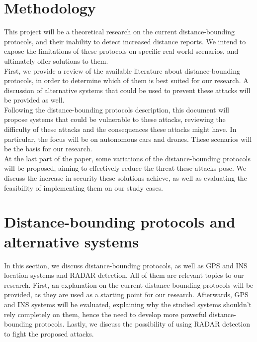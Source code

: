 \documentclass{article}
\begin{document}
\section{Methodology}
\label{sec:methodology}

This project will be a theoretical research on the current distance-bounding protocols, and their inability to detect increased distance reports. We intend to expose the limitations of these protocols on specific real world scenarios, and ultimately offer solutions to them.\\

First, we provide a review of the available literature about distance-bounding protocols, in order to determine which of them is best suited for our research. A discussion of alternative systems that could be used to prevent these attacks will be provided as well.\\

Following the distance-bounding protocols description, this document will propose systems that could be vulnerable to these attacks, reviewing the difficulty of these attacks and the consequences these attacks might have. In particular, the focus will be on autonomous cars and drones. These scenarios will be the basis for our research.\\

At the last part of the paper, some variations of the distance-bounding protocols will be proposed, aiming to effectively reduce the threat these attacks pose. We discuss the increase in security these solutions achieve, as well as evaluating the feasibility of implementing them on our study cases.\\













\section{Distance-bounding protocols and alternative systems}
\label{sec:dbandalternative}

In this section, we discuss distance-bounding protocols, as well as GPS and INS location systems and RADAR detection. All of them are relevant topics to our research. First, an explanation on the current distance bounding protocols will be provided, as they are used as a starting point for our research. Afterwards, GPS and INS systems will be evaluated, explaining why the studied systems shouldn't rely completely on them, hence the need to develop more powerful distance-bounding protocols. Lastly, we discuss the possibility of using RADAR detection to fight the proposed attacks.\\
\end{document}
